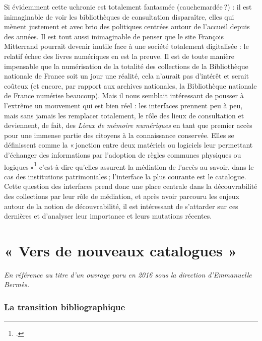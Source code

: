 Si évidemment cette uchronie est totalement fantasmée (cauchemardée ?) : il est inimaginable de voir les bibliothèques de consultation disparaître, elles qui mènent justement et avec brio des politiques centrées autour de l’accueil depuis des années. Il est tout aussi inimaginable de penser que le site François Mitterrand pourrait devenir inutile face à une société totalement digitalisée : le relatif échec des livres numériques en est la preuve. Il est de toute manière impensable que la numérisation de la totalité des collections de la Bibliothèque nationale de France soit un jour une réalité, cela n’aurait pas d’intérêt et serait coûteux (et encore, par rapport aux archives nationales, la Bibliothèque nationale de France numérise beaucoup). Mais il nous semblait intéressant de pousser à l’extrême un mouvement qui est bien réel : les interfaces prennent peu à peu, mais sans jamais les remplacer totalement, le rôle des lieux de consultation et deviennent, de fait, des \textit{Lieux de mémoire numériques }en tant que premier accès pour une immense partie des citoyens à la connaissance conservée. Elles se définissent comme la « jonction entre deux matériels ou logiciels leur permettant d’échanger des informations par l’adoption de règles communes physiques ou logiques »\footcite{zotero-205} c’est-à-dire qu’elles assurent la médiation de l’accès au savoir, dans le cas des institutions patrimoniales ; l’interface la plus courante est le catalogue. Cette question des interfaces prend donc une place centrale dans la découvrabilité des collections par leur rôle de médiation, et après avoir parcouru les enjeux autour de la notion de découvrabilité, il est intéressant de s’attarder sur ces dernières et d’analyser leur importance et leurs mutations récentes.

\chapter{« Vers de nouveaux catalogues »}

\vspace{-3em} %

\textit{En référence au titre d’un ouvrage paru en 2016 sous la direction d’Emmanuelle Bermès.}

\subsection{La transition bibliographique}

